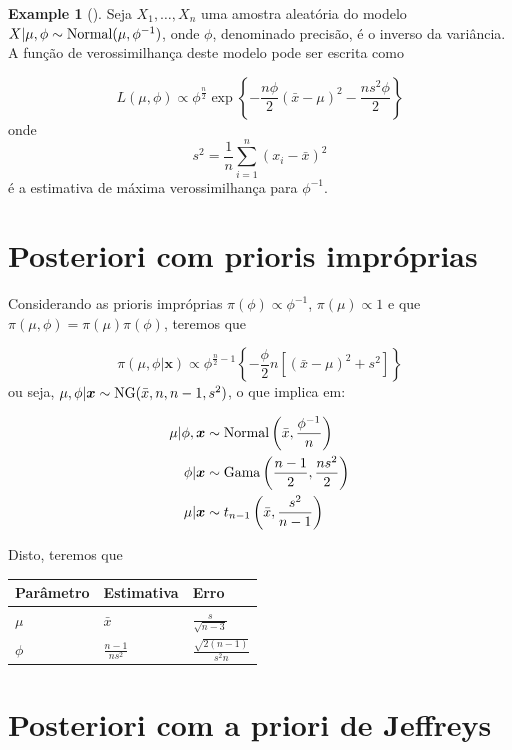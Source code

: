 \documentclass[
  letterpaper,
  DIV=11,
  numbers=noendperiod]{scrreprt}
\theoremstyle{definition}
\theoremstyle{plain}
\theoremstyle{definition}
\newtheorem{example}{Example}[chapter]
\theoremstyle{remark}
\begin{document}
\begin{example}[]
Seja \(X_1,\ldots,X_n\) uma amostra aleatória do modelo
\(X|\mu,\phi\sim\hbox{Normal}(\mu,\phi^{-1})\), onde \(\phi\),
denominado precisão, é o inverso da variância. A função de
verossimilhança deste modelo pode ser escrita como

\[L(\mu,\phi)\propto \phi^{\frac{n}{2}}\exp\left\{-\frac{n\phi}{2}(\bar{x}-\mu)^2 -\frac{ns^2\phi}{2}\right\}\]
onde \[s^2=\frac{1}{n}\sum_{i=1}^n(x_i-\bar{x})^2\] é a estimativa de
máxima verossimilhança para \(\phi^{-1}\).

\section{Posteriori com prioris
impróprias}\label{posteriori-com-prioris-impruxf3prias}

Considerando as prioris impróprias \(\pi(\phi)\propto \phi^{-1}\),
\(\pi(\mu)\propto 1\) e que \(\pi(\mu,\phi)=\pi(\mu)\pi(\phi)\), teremos
que

\[\pi(\mu,\phi|\boldsymbol{x})\propto \phi^{\frac{n}{2}-1}\left\{-\frac{\phi}{2}n\left[ (\bar{x}-\mu)^2 +s^2\right]\right\}\]
ou seja, \(\mu,\phi|\boldsymbol{x}\sim\hbox{NG}(\bar{x},n,n-1,s^2)\), o
que implica em:

\[\begin{align}
\mu|\phi,\boldsymbol{x}&\sim\hbox{Normal}\left(\bar{x},\frac{\phi^{-1}}{n}\right)\\
\phi|\boldsymbol{x}&\sim\hbox{Gama}\left(\frac{n-1}{2},\frac{ns^2}{2}\right)\\
\mu|\boldsymbol{x}&\sim t_{n-1}\left(\bar{x},\frac{s^2}{n-1}\right)
\end{align}\]

Disto, teremos que

\begin{longtable}[]{@{}lll@{}}
\toprule\noalign{}
Parâmetro & Estimativa & Erro \\
\midrule\noalign{}
\endhead
\bottomrule\noalign{}
\endlastfoot
\(\mu\) & \(\bar{x}\) & \(\frac{s}{\sqrt{n-3}}\) \\
\(\phi\) & \(\frac{n-1}{ns^2}\) & \(\frac{\sqrt{2(n-1)}}{s^2n}\) \\
\end{longtable}

\section{Posteriori com a priori de
Jeffreys}\label{posteriori-com-a-priori-de-jeffreys}


\end{example}
\end{document}
